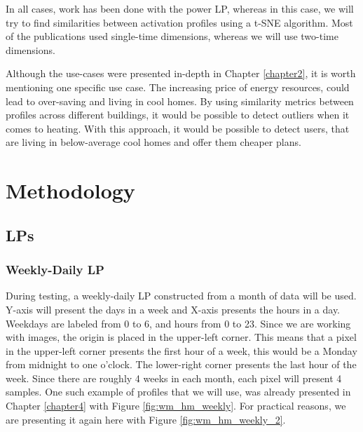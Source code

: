 In all cases, work has been done with the power LP, whereas in this case, we will try to find similarities between activation profiles using a t-SNE algorithm.
Most of the publications used single-time dimensions, whereas we will use two-time dimensions.

Although the use-cases were presented in-depth in Chapter \ref{chapter2}, it is worth mentioning one specific use case.
The increasing price of energy resources, could lead to over-saving and living in cool homes.
By using similarity metrics between profiles across different buildings, it would be possible to detect outliers when it comes to heating. 
With this approach, it would be possible to detect users, that are living in below-average cool homes and offer them cheaper plans. 

\section{Methodology}

\subsection{LPs}

\subsubsection{Weekly-Daily LP}

During testing, a weekly-daily LP constructed from a month of data will be used.
Y-axis will present the days in a week and X-axis presents the hours in a day.
Weekdays are labeled from 0 to 6, and hours from 0 to 23.
Since we are working with images, the origin is placed in the upper-left corner. 
This means that a pixel in the upper-left corner presents the first hour of a week,
this would be a Monday from midnight to one o'clock. 
The lower-right corner presents the last hour of the week.
Since there are roughly 4 weeks in each month, each pixel will present 4 samples. 
One such example of profiles that we will use, was already presented in Chapter \ref{chapter4} with Figure \ref{fig:wm_hm_weekly}.
For practical reasons, we are presenting it again here with Figure \ref{fig:wm_hm_weekly_2}.

